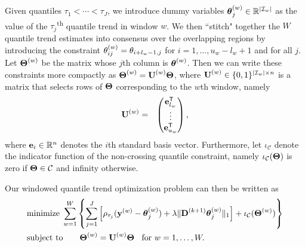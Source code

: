 \documentclass[12pt]{article}
\newcommand{\Real}{\mathbb{R}}
\newcommand{\Tra}{^{\sf T}} %
\newcommand{\V}[1]{{\bm{\mathbf{\MakeLowercase{#1}}}}} %
\newcommand{\VE}[2]{\MakeLowercase{#1}_{#2}} %
\newcommand{\Vn}[2]{\V{#1}^{(#2)}} %
\newcommand{\VnE}[3]{{#1}^{(#2)}_{#3}} %
\newcommand{\M}[1]{{\bm{\mathbf{\MakeUppercase{#1}}}}} %
\newcommand{\Mn}[2]{\M{#1}^{(#2)}} %
\begin{document}
%
Given quantiles $\tau_1 < \cdots < \tau_J$, we introduce dummy variables $\Vn{\theta}{w}_{j} \in \Real^{\lvert \mathcal{I}_w \rvert}$ as the value of the $\tau_j$\textsuperscript{th} quantile trend in window $w$. We then ``stitch" together the $W$ quantile trend estimates into consensus over the overlapping regions by introducing the constraint $\VnE{\theta}{w}{ij} = \VE{\theta}{i + l_w - 1,j}$ for $i = 1, \ldots, u_w - l_w + 1$ and for all $j$. Let $\Mn{\Theta}{w}$ be the matrix whose $j$th column is $\Vn{\theta}{w}$. Then we can write these constraints more compactly as $\Mn{\Theta}{w} = \Mn{U}{w}\M{\Theta}$, where $\Mn{U}{w} \in \{0, 1\}^{\lvert \mathcal{I}_w \rvert \times n}$ is a matrix that selects rows of $\M{\Theta}$ corresponding to the $w$th window, namely
\begin{eqnarray*}
\Mn{U}{w} & = & \begin{pmatrix}
\V{e}_{l_w}\Tra \\
\vdots \\
\V{e}_{u_w}\Tra
\end{pmatrix},
\end{eqnarray*}
where $\V{e}_i \in \Real^{n}$ denotes the $i$th standard basis vector. Furthermore, let $\iota_{\mathcal{C}}$ denote the indicator function of the non-crossing quantile constraint, namely $\iota_{\mathcal{C}}(\M{\Theta})$ is zero if $\M{\Theta} \in \mathcal{C}$ and infinity otherwise.

	Our windowed quantile trend optimization problem can then be written as
	 \begin{equation}
		 \label{eq:quantile_windows}
		 \begin{split}
		 &\text{minimize}\; \sum_{w=1}^W \left \{\sum_{j=1}^J \left [\rho_{\tau_j}(\Vn{y}{w} - \Vn{\theta}{w}_{j}) +
		 \lambda \lVert \Mn{D}{k+1} \Vn{\theta}{w}_{j} \rVert_1 \right ] + \iota_\mathcal{C}(\Mn{\Theta}{w}) \right\}\\
		 &\text{subject to} \qquad \Mn{\Theta}{w} = \Mn{U}{w}\M{\Theta} \;\; \text{ for } w = 1, \ldots, W.
		 \end{split}
	 \end{equation}
\end{document}
